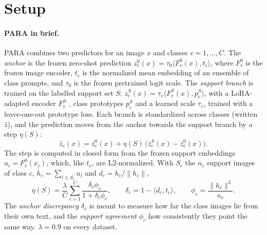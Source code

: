 \section{Setup}\label{sec:setup}

\paragraph{PARA in brief.}
PARA \citep{kang2026para} combines two predictors for an image $x$ and classes $c = 1, \dots, C$.
The \emph{anchor} is the frozen zero-shot prediction
$z^0_c(x) = \tau_0 \langle F^0_v(x), t_c \rangle$, where $F^0_v$ is the frozen image encoder,
$t_c$ is the normalized mean embedding of an ensemble of class prompts, and $\tau_0$ is the frozen pretrained logit scale.
The \emph{support branch} is trained on the labelled support set $S$:
$z^S_c(x) = \tau_v \langle F^S_v(x), p^S_c \rangle$, with a LoRA-adapted encoder $F^S_v$ \citep{hu2022lora},
class prototypes $p^S_c$ and a learned scale $\tau_v$, trained with a leave-one-out prototype loss.
Each branch is standardized across classes (written $\bar z$), and the prediction moves from the anchor towards the support branch by a step $\eta(S)$:
\begin{equation}
  \hat z_c(x) = \bar z^0_c(x) + \eta(S)\,\big(\bar z^S_c(x) - \bar z^0_c(x)\big).
  \label{eq:blend}
\end{equation}
The step is computed in closed form from the frozen support embeddings $u_i = F^0_v(x_i)$, which, like $t_c$, are L2-normalized.
With $S_c$ the $n_c$ support images of class $c$, $h_c = \sum_{i \in S_c} u_i$ and $d_c = h_c / \lVert h_c \rVert$,
\begin{equation}
  \eta(S) = \frac{\lambda}{C} \sum_{c=1}^{C} \frac{\delta_c \phi_c}{1 + \delta_c \phi_c},
  \qquad
  \delta_c = 1 - \langle d_c, t_c \rangle,
  \qquad
  \phi_c = \frac{\lVert h_c \rVert^2}{n_c}.
  \label{eq:eta}
\end{equation}
The \emph{anchor discrepancy} $\delta_c$ is meant to measure how far the class images lie from their own text,
and the \emph{support agreement} $\phi_c$ how consistently they point the same way.
$\lambda = 0.9$ on every dataset.

